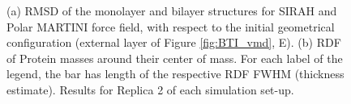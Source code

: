 \begin{figure}[h!]
    \caption[Replica 2: Comparison of monolayer and bilayer structural properties]{(a) RMSD of the monolayer and bilayer structures for SIRAH and Polar MARTINI force field, with respect to the initial geometrical configuration (external layer of Figure \ref{fig:BTI_vmd}, E). (b) RDF of Protein masses around their center of mass. For each label of the legend, the bar has length of the respective RDF FWHM (thickness estimate). Results for Replica 2 of each simulation set-up.}
\label{fig:mono_bi2}
\end{figure}

